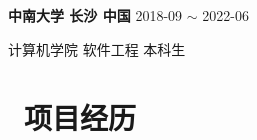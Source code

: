 \documentclass[10pt, a4paper]{article}
\begin{document}
\textbf{中南大学 \quad 长沙 \quad 中国} \hfill 2018-09 $\sim$ 2022-06

计算机学院 \quad 软件工程 \quad 本科生

\section{\color{CVBlue}\faUsers\ 项目经历}

















\end{document}

